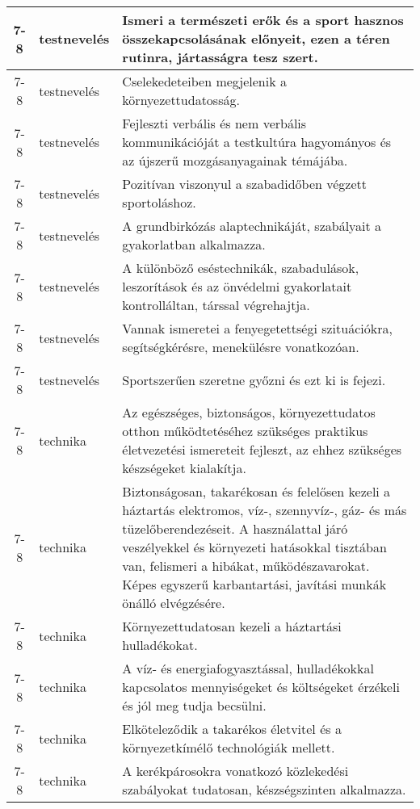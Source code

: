 \begin{small}
\begin{longtable}{c | p{2cm} |  p{11cm} }
              7-8 & testnevelés & Ismeri a természeti erők és a sport hasznos összekapcsolásának előnyeit, ezen a téren rutinra, jártasságra tesz szert. \\ \hline
              7-8 & testnevelés & Cselekedeteiben megjelenik a környezettudatosság. \\ \hline
              7-8 & testnevelés & Fejleszti verbális és nem verbális kommunikációját a testkultúra hagyományos és az újszerű mozgásanyagainak témájába. \\ \hline
              7-8 & testnevelés & Pozitívan viszonyul a szabadidőben végzett sportoláshoz. \\ \hline
              7-8 & testnevelés & A grundbirkózás alaptechnikáját, szabályait a gyakorlatban alkalmazza. \\ \hline
              7-8 & testnevelés & A különböző eséstechnikák, szabadulások, leszorítások és az önvédelmi gyakorlatait kontrolláltan, társsal végrehajtja. \\ \hline
              7-8 & testnevelés & Vannak ismeretei a fenyegetettségi szituációkra, segítségkérésre, menekülésre vonatkozóan. \\ \hline
              7-8 & testnevelés & Sportszerűen szeretne győzni és ezt ki is fejezi. \\ \hline
              7-8 & technika & Az egészséges, biztonságos, környezettudatos otthon működtetéséhez szükséges praktikus életvezetési ismereteit fejleszt, az ehhez szükséges készségeket kialakítja. \\ \hline
              7-8 & technika & Biztonságosan, takarékosan és felelősen kezeli a háztartás elektromos, víz-, szennyvíz-, gáz- és más tüzelőberendezéseit. A használattal járó veszélyekkel és környezeti hatásokkal tisztában van, felismeri a hibákat, működészavarokat. Képes egyszerű karbantartási, javítási munkák önálló elvégzésére. \\ \hline
              7-8 & technika & Környezettudatosan kezeli a háztartási hulladékokat. \\ \hline
              7-8 & technika & A víz- és energiafogyasztással, hulladékokkal kapcsolatos mennyiségeket és költségeket érzékeli és jól meg tudja becsülni. \\ \hline
              7-8 & technika & Elköteleződik a takarékos életvitel és a környezetkímélő technológiák mellett. \\ \hline
              7-8 & technika & A kerékpárosokra vonatkozó közlekedési szabályokat tudatosan, készségszinten alkalmazza. \\ \hline

\end{longtable}
\end{small}
